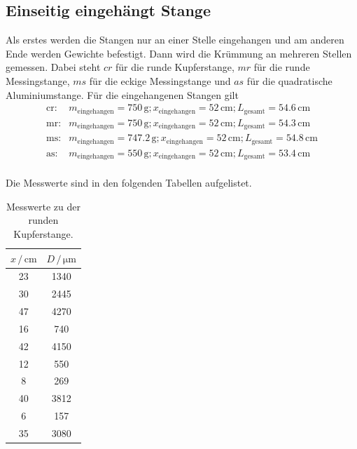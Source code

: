\subsection{Einseitig eingehängt Stange}
Als erstes werden die Stangen nur an einer Stelle eingehangen und am anderen Ende werden Gewichte befestigt. Dann wird die Krümmung an mehreren Stellen gemessen.
 Dabei steht $cr$ für die runde Kupferstange, $mr$ für die runde Messingstange, $ms$ für die eckige Messingstange und $as$ für die
quadratische Aluminiumstange.
Für die eingehangenen Stangen gilt
\begin{align*}
\text{cr}:& m_\text{eingehangen} = 750 \, \si{\gram}; x_\text{eingehangen} = 52 \, \si{\centi\meter}; L_\text{gesamt} = 54.6 \, \si{\centi\meter} \\
\text{mr}:& m_\text{eingehangen} = 750 \, \si{\gram}; x_\text{eingehangen} = 52 \, \si{\centi\meter}; L_\text{gesamt} = 54.3 \, \si{\centi\meter} \\
\text{ms}:& m_\text{eingehangen} = 747.2 \, \si{\gram}; x_\text{eingehangen} = 52 \, \si{\centi\meter}; L_\text{gesamt} = 54.8 \, \si{\centi\meter} \\
\text{as}:& m_\text{eingehangen} = 550 \, \si{\gram}; x_\text{eingehangen} = 52 \, \si{\centi\meter}; L_\text{gesamt} =  53.4 \, \si{\centi\meter} \\
\end{align*}

\noindent
Die Messwerte sind in den folgenden Tabellen aufgelistet.

\begin{table}
	\centering
	\caption{Messwerte zu der runden Kupferstange.} 
	\label{tab:vana} 
	\begin{tabular}{c c}
	\toprule
	$x \, / \, \si{\centi\meter}$ & $D \, / \, \si{\micro\meter}$\\
	\midrule
    23     &     1340\\
    30     &     2445\\
    47     &     4270\\
    16     &      740\\
    42     &     4150\\
    12     &      550\\
    8      &      269\\
    40     &     3812\\
    6      &      157\\
    35     &     3080\\
\bottomrule
	\end{tabular}
\end{table}

